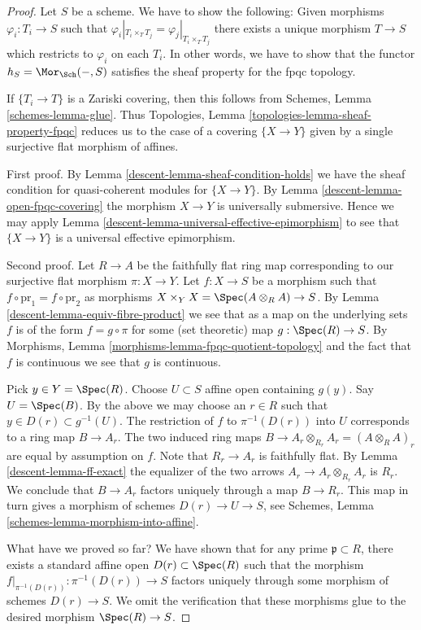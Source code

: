 \begin{proof}

Let $S$ be a scheme. We have to show the following:
Given morphisms $\varphi_i : T_i \to S$
such that $\varphi_i|_{T_i \times_T T_j} = \varphi_j|_{T_i \times_T T_j}$
there exists a unique morphism $T \to S$ which restricts
to $\varphi_i$ on each $T_i$.
In other words, we have to show that the functor
$h_S = \Mor_{\Sch}( - , S)$ satisfies
the sheaf property for the fpqc topology.

\medskip\noindent
If $\{T_i \to T\}$ is a Zariski covering, then this follows from
Schemes, Lemma \ref{schemes-lemma-glue}.
Thus Topologies, Lemma \ref{topologies-lemma-sheaf-property-fpqc}
reduces us to the case of a covering $\{X \to Y\}$
given by a single surjective flat morphism of affines.

\medskip\noindent
First proof. By Lemma \ref{descent-lemma-sheaf-condition-holds}
we have the sheaf condition for quasi-coherent modules
for $\{X \to Y\}$. By Lemma \ref{descent-lemma-open-fpqc-covering}
the morphism $X \to Y$ is universally submersive.
Hence we may apply Lemma \ref{descent-lemma-universal-effective-epimorphism}
to see that $\{X \to Y\}$ is a universal effective epimorphism.

\medskip\noindent
Second proof. Let $R \to A$ be the faithfully flat ring map
corresponding to our surjective flat morphism $\pi : X \to Y$.
Let $f : X \to S$ be a morphism
such that $f \circ \text{pr}_1 = f \circ \text{pr}_2$
as morphisms $X \times_Y X = \Spec(A \otimes_R A) \to S$.
By Lemma \ref{descent-lemma-equiv-fibre-product} we see that
as a map on the underlying
sets $f$ is of the form $f = g \circ \pi$ for some
(set theoretic) map $g : \Spec(R) \to S$.
By Morphisms, Lemma \ref{morphisms-lemma-fpqc-quotient-topology}
and the fact that $f$ is continuous we see that $g$
is continuous.

\medskip\noindent
Pick $y \in Y = \Spec(R)$.
Choose $U \subset S$ affine open containing $g(y)$.
Say $U = \Spec(B)$.
By the above we may choose an $r \in R$ such that
$y \in D(r) \subset g^{-1}(U)$.
The restriction of $f$ to $\pi^{-1}(D(r))$ into $U$
corresponds to a ring map $B \to A_r$. The two induced
ring maps $B \to A_r \otimes_{R_r} A_r = (A \otimes_R A)_r$ are equal
by assumption on $f$.
Note that $R_r \to A_r$ is faithfully flat.
By Lemma \ref{descent-lemma-ff-exact} the equalizer of
the two arrows $A_r \to A_r \otimes_{R_r} A_r$ is $R_r$.
We conclude that $B \to A_r$ factors uniquely through a map $B \to R_r$.
This map in turn gives a morphism of schemes $D(r) \to U \to S$,
see Schemes, Lemma \ref{schemes-lemma-morphism-into-affine}.

\medskip\noindent
What have we proved so far? We have shown that for any prime
$\mathfrak p \subset R$, there exists a standard affine open
$D(r) \subset \Spec(R)$ such that the morphism
$f|_{\pi^{-1}(D(r))} : \pi^{-1}(D(r)) \to S$ factors uniquely
through some morphism of schemes $D(r) \to S$. We omit the
verification that these morphisms glue to the desired
morphism $\Spec(R) \to S$.
\end{proof}

